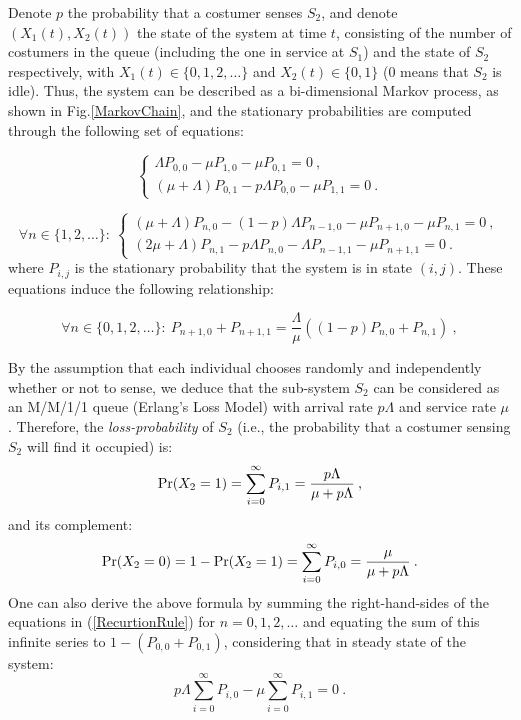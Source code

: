 \documentclass[11pt]{article}
\numberwithin{equation}{section}
\newcommand{\pr}{{\rm Pr}}
\begin{document}
Denote $p$ the probability that a costumer senses $S_{2}$, and denote $(X_{1}(t), X_{2}(t))$ the state of the system at time $t$, consisting of the number of costumers in the queue (including the one in service at $S_{1}$) and the state of $S_{2}$ respectively, with $X_{1}(t) \in \lbrace0, 1, 2, \ldots\rbrace$ and $X_{2}(t) \in \lbrace0, 1\rbrace$ (0 means that $S_{2}$ is idle). Thus, the system can be described as a bi-dimensional Markov process, as shown in Fig.\ref{MarkovChain}, and the stationary probabilities are computed through the following set of equations: 

\begin{equation}
  \begin{cases}
    \Lambda P_{0,0} - \mu P_{1,0}  - \mu P_{0,1} = 0\:,\\
    (\mu+\Lambda) P_{0,1} - p\Lambda P_{0,0}  - \mu P_{1,1} = 0\:.
  \end{cases}
	\label{StateEq1}
\end{equation}

\begin{equation}
  \forall n \in \lbrace 1, 2, \ldots \rbrace: \ \begin{cases}
    (\mu+\Lambda) P_{n,0} - (1-p) \Lambda P_{n-1, 0} - \mu P_{n+1,0}  - \mu P_{n,1} = 0\:,\\
    (2\mu+\Lambda) P_{n,1} - p\Lambda P_{n,0}  - \Lambda P_{n-1,1} - \mu P_{n+1,1} = 0\:.
  \end{cases} \label{StateEq2}
\end{equation}
where $P_{i,j}$ is the stationary probability that the system is in state $(i,j)$. These equations induce the following relationship:

\begin{equation}
  \forall n \in \lbrace 0, 1, 2, \ldots \rbrace: \ 
    P_{n+1,0} + P_{n+1,1} = \dfrac{\Lambda}{\mu}((1-p) P_{n,0} + P_{n, 1})\:, \label{RecurtionRule}
\end{equation}

By the assumption that each individual chooses randomly and independently whether or not to sense, we deduce that the sub-system $S_{2}$ can be considered as an M/M/1/1 queue (Erlang's Loss Model) with arrival rate $p\Lambda$ and service rate $\mu$. Therefore, the {\it loss-probability} of $S_{2}$ (i.e., the probability that a costumer sensing $S_{2}$ will find it occupied) is:
\begin{equation}
	\pr(X_2=1) = \sum\limits_{i=0}^{\infty} P_{i, 1} = \dfrac{p\Lambda}{\mu+p\Lambda}\:, \label{LossProb}
\end{equation}
and its complement:
\begin{equation}
	\pr(X_2=0) = 1-\pr(X_2=1) = \sum\limits_{i=0}^{\infty} P_{i, 0} = \dfrac{\mu}{\mu+p\Lambda}\:. \label{OMLossProb}
\end{equation}
One can also derive the above formula by summing the right-hand-sides of the equations in (\ref{RecurtionRule}) for $n=0,1,2,\ldots$ and equating the sum of this infinite series to $1-(P_{0,0}+P_{0,1})$, considering that in steady state of the system: \[ p\Lambda\sum_{i=0}^{\infty}P_{i,0} - \mu \sum_{i=0}^{\infty}P_{i,1} = 0\:.\]
\end{document}
